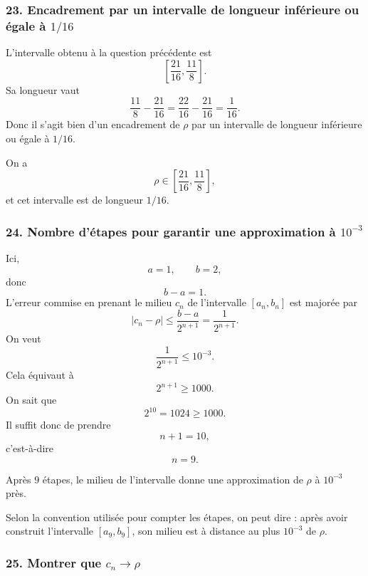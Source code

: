 \documentclass[11pt,a4paper]{article}
\begin{document}

\subsubsection*{23. Encadrement par un intervalle de longueur inférieure ou égale à \(1/16\)}

L'intervalle obtenu à la question précédente est
\[
\left[\frac{21}{16},\frac{11}{8}\right].
\]
Sa longueur vaut
\[
\frac{11}{8}-\frac{21}{16}
=
\frac{22}{16}-\frac{21}{16}
=
\frac1{16}.
\]
Donc il s'agit bien d'un encadrement de \(\rho\) par un intervalle de longueur inférieure ou égale à \(1/16\).

\begin{resultatbox}
On a
\[
\rho\in\left[\frac{21}{16},\frac{11}{8}\right],
\]
et cet intervalle est de longueur \(1/16\).
\end{resultatbox}


\subsubsection*{24. Nombre d'étapes pour garantir une approximation à \(10^{-3}\)}

Ici,
\[
a=1,\qquad b=2,
\]
donc
\[
b-a=1.
\]
L'erreur commise en prenant le milieu \(c_n\) de l'intervalle \([a_n,b_n]\) est majorée par
\[
|c_n-\rho|\leq \frac{b-a}{2^{n+1}}
=
\frac1{2^{n+1}}.
\]
On veut
\[
\frac1{2^{n+1}}\leq 10^{-3}.
\]
Cela équivaut à
\[
2^{n+1}\geq 1000.
\]
On sait que
\[
2^{10}=1024\geq1000.
\]
Il suffit donc de prendre
\[
n+1=10,
\]
c'est-à-dire
\[
n=9.
\]

\begin{resultatbox}
Après \(9\) étapes, le milieu de l'intervalle donne une approximation de \(\rho\) à \(10^{-3}\) près.
\end{resultatbox}

\begin{remarquebox}
Selon la convention utilisée pour compter les étapes, on peut dire : après avoir construit l'intervalle \([a_9,b_9]\), son milieu est à distance au plus \(10^{-3}\) de \(\rho\).
\end{remarquebox}


\subsubsection*{25. Montrer que \(c_n\to\rho\)}
\end{document}
